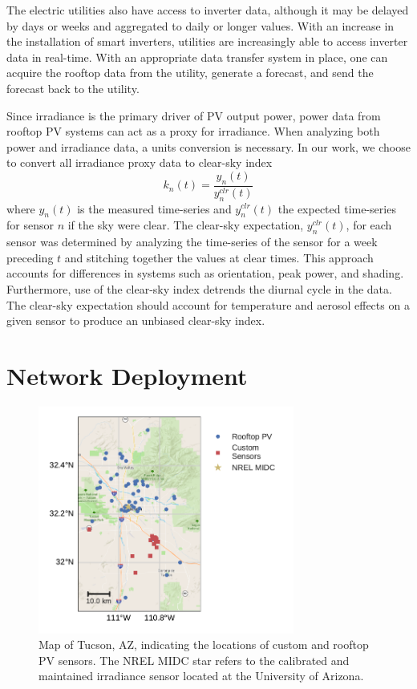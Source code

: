 The electric utilities also have access to inverter data, although it
may be delayed by days or weeks and aggregated to daily or longer values.
With an increase in the installation of smart inverters, utilities are
increasingly able to access inverter data in real-time.
With an appropriate data transfer system in place, one can acquire
the rooftop data from the utility, generate a forecast, and send the
forecast back to the utility.

Since irradiance is the primary driver of PV output power, power data
from rooftop PV systems can act as a proxy for irradiance.
When analyzing both power and irradiance data, a units conversion is
necessary.
In our work, we choose to convert all irradiance proxy data to
clear-sky index
\begin{equation}
\label{eq:clrind}
k_n(t) = \frac{y_n(t)}{y_n^{clr}(t)}
\end{equation}
where $y_n(t)$ is the measured time-series and $y_n^{clr}(t)$ the
expected time-series for sensor $n$ if the sky were clear.
The clear-sky expectation, $y_n^{clr}(t)$, for each sensor was
determined by analyzing the time-series of the sensor for a week
preceding $t$ and stitching together the values at clear times.
This approach accounts for differences in systems such as orientation,
peak power, and shading.
Furthermore, use of the clear-sky index detrends the diurnal cycle in the data.
The clear-sky expectation should account for temperature and aerosol
effects on a given sensor to produce an unbiased clear-sky index.

\section{Network Deployment}
\begin{figure}[h]
\centering
\includegraphics[width=0.75\textwidth]{figs/map.pdf}
\caption[Map of sensor locations]{Map of Tucson, AZ, indicating the
  locations of custom and rooftop PV sensors. The NREL MIDC star
  refers to the calibrated and maintained irradiance sensor located at
  the University of Arizona.}
\label{fig:map}
\end{figure}

